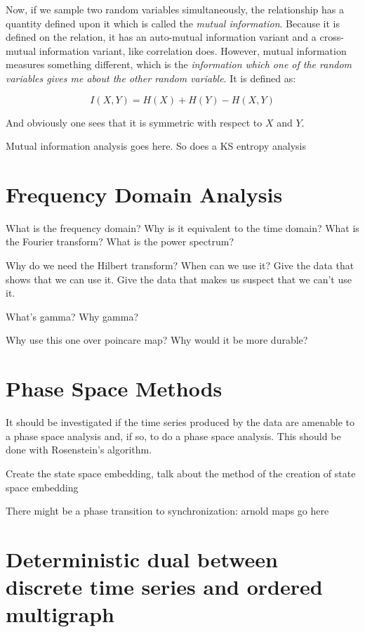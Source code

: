 \documentclass[12pt]{article}
\begin{document}
Now, if we sample two random variables simultaneously, the relationship has a quantity defined upon it which is called the \emph{mutual information}. Because it is defined on the relation, it has an auto-mutual information variant and a cross-mutual information variant, like correlation does. However, mutual information measures something different, which is the \emph{information which one of the random variables gives me about the other random variable}. It is defined as:

$$I(X, Y) = H(X) + H(Y) - H(X, Y)$$

And obviously one sees that it is symmetric with respect to $X$ and $Y$.


Mutual information analysis goes here. So does a KS entropy analysis

\section{Frequency Domain Analysis}

What is the frequency domain? Why is it equivalent to the time domain? What is the Fourier transform? What is the power spectrum?

Why do we need the Hilbert transform? When can we use it? Give the data that shows that we can use it. Give the data that makes us suspect that we can't use it.

What's gamma? Why gamma? %

Why use this one over poincare map? Why would it be more durable?

\section{Phase Space Methods}

It should be investigated if the time series produced by the data are amenable to a phase space analysis and, if so, to do a phase space analysis. This should be done with Rosenstein's algorithm.


Create the state space embedding, talk about the method of the creation of state space embedding

There might be a phase transition to synchronization: arnold maps go here

\section{Deterministic dual between discrete time series and ordered multigraph}
\end{document}
